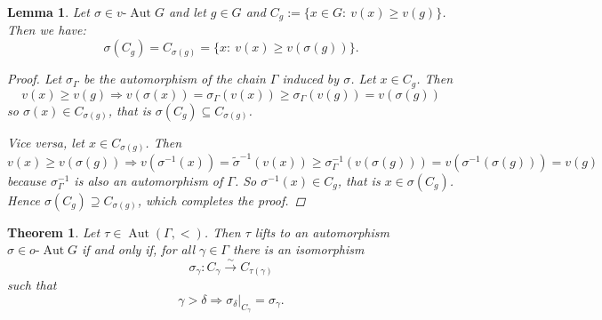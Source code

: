 \documentclass[10pt,a4paper]{amsart}
\newtheorem{lemma}{Lemma}
\newtheorem{theorem}{Theorem}
\DeclareMathOperator{\Aut}{Aut}
\newcommand{\G}{\Gamma}
\newcommand{\Ra}{\Rightarrow}
\newcommand{\lra}{\longrightarrow}
\newcommand{\oAut}{o\text{-}\Aut}
\newcommand{\vAut}{v\text{-}\Aut}
\begin{document}
\begin{lemma}
	\label{h-commutes-C}
	Let $\sigma\in\vAut G$ and let $g\in G$ and $C_g := \{x\in G:\ v(x)\geq v(g)\}$. Then we have:
	$$\sigma(C_g) = C_{\sigma(g)} = \{x:\ v(x) \geq v(\sigma(g))\}.$$
	\begin{proof}
		Let $ \sigma_\Gamma$ be the automorphism of the chain $\Gamma$ induced by $\sigma$.
		Let $x\in C_g$. Then
		$$v(x)\geq v(g) \Ra v(\sigma(x)) = \sigma_\Gamma (v(x)) \geq \sigma_\Gamma (v(g)) = v(\sigma(g))$$
		so $\sigma(x) \in C_{\sigma(g)}$, that is $\sigma(C_g) \subseteq C_{\sigma(g)}$.
		
		Vice versa, let $x\in C_{\sigma(g)}$. Then
		$$
		v(x) \geq v(\sigma(g)) \Ra
		v(\sigma^{-1}(x)) = \tilde \sigma^{-1}(v(x)) \geq \sigma_\Gamma^{-1}(v(\sigma(g)))= v(\sigma^{-1}(\sigma(g)))=v(g)
		$$
		because $\sigma_\Gamma^{-1}$ is also an automorphism of $\Gamma$.
		So $\sigma^{-1}(x) \in C_g$, that is $x\in \sigma(C_g)$.
		Hence $\sigma(C_g) \supseteq C_{\sigma(g)}$, which completes the proof.
	\end{proof}
\end{lemma}

\begin{theorem}
	\label{lifting-principal-convex-sbgps}
	Let $\tau\in\Aut(\G, <)$. Then $\tau$ lifts to an automorphism
	$\sigma \in \oAut G$ if and only if, for all $\gamma\in\Gamma$ there is an isomorphism
	$$
	\sigma_\gamma\colon C_\gamma \overset{\sim}{\lra} C_{\tau(\gamma)}
	$$
	such that 
	\begin{equation}
	\label{cond-gamma-delta}
	\gamma>\delta \Rightarrow \sigma_\delta|_{C_\gamma}=\sigma_\gamma.
	\end{equation}
\end{theorem}
\end{document}
